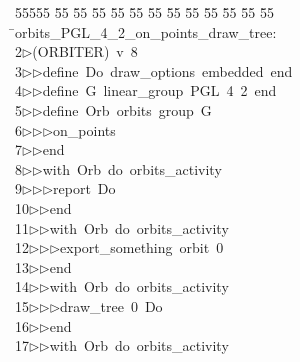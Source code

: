 %
%
\begin{tabbing}
55555 \= 55 \= 55 \= 55 \= 55 \= 55 \= 55 \= 55 \= 55 \= 55 \= 55 \= 55 \= 55 \= \>orbits\_PGL\_4\_2\_on\_points\_draw\_tree:\\[0pt]
2\>$\triangleright$\>(ORBITER)\ v\ 8\ \\[0pt]
3\>$\triangleright$\>$\triangleright$\>define\ Do\ draw\_options\ embedded\ end\ \\[0pt]
4\>$\triangleright$\>$\triangleright$\>define\ G\ linear\_group\ PGL\ 4\ 2\ end\ \\[0pt]
5\>$\triangleright$\>$\triangleright$\>define\ Orb\ orbits\ group\ G\ \\[0pt]
6\>$\triangleright$\>$\triangleright$\>$\triangleright$\>on\_points\ \\[0pt]
7\>$\triangleright$\>$\triangleright$\>end\ \\[0pt]
8\>$\triangleright$\>$\triangleright$\>with\ Orb\ do\ orbits\_activity\ \\[0pt]
9\>$\triangleright$\>$\triangleright$\>$\triangleright$\>report\ Do\ \\[0pt]
10\>$\triangleright$\>$\triangleright$\>end\ \\[0pt]
11\>$\triangleright$\>$\triangleright$\>with\ Orb\ do\ orbits\_activity\ \\[0pt]
12\>$\triangleright$\>$\triangleright$\>$\triangleright$\>export\_something\ orbit\ 0\ \\[0pt]
13\>$\triangleright$\>$\triangleright$\>end\ \\[0pt]
14\>$\triangleright$\>$\triangleright$\>with\ Orb\ do\ orbits\_activity\ \\[0pt]
15\>$\triangleright$\>$\triangleright$\>$\triangleright$\>draw\_tree\ 0\ Do\ \\[0pt]
16\>$\triangleright$\>$\triangleright$\>end\ \\[0pt]
17\>$\triangleright$\>$\triangleright$\>with\ Orb\ do\ orbits\_activity\ \\[0pt]

\end{tabbing}
